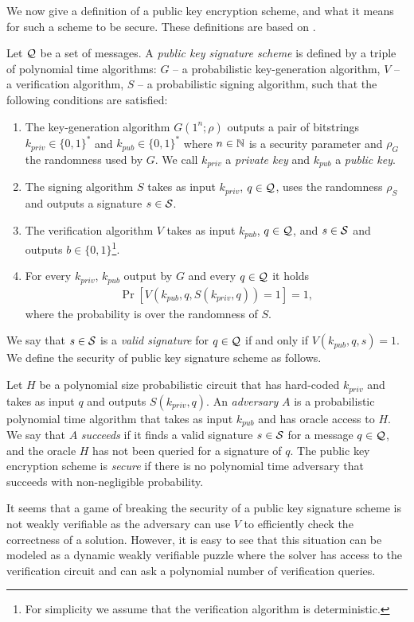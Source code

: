 We now give a definition of a public key encryption scheme, and what it means for such a scheme to be secure.
These definitions are based on \cite{Goldreich:2004:FCV:975541}.

\begin{definition}
Let $\mathcal{Q}$ be a set of messages. A \textit{public key signature scheme} is defined by a triple of polynomial time algorithms:
$G$ -- a probabilistic key-generation algorithm,
$V$ -- a verification algorithm,
$S$ -- a probabilistic signing algorithm,
such that the following conditions are satisfied:
\begin{enumerate}[-]
  \item The key-generation algorithm $G(1^n; \rho)$ outputs a pair of bitstrings $k_{priv} \in \{0,1\}^{*}$ and $k_{pub} \in \{0,1\}^{*}$ where $n \in \mathbb{N}$ is a security
    parameter and $\rho_G$ the randomness used by $G$. We call $k_{priv}$ a \textit{private key} and $k_{pub}$ a \textit{public key}.
  \item The signing algorithm $S$ takes as input $k_{priv}$, $q \in \mathcal{Q}$, uses the randomness $\rho_S$ and outputs a signature $s \in \mathcal{S}$.
  \item The verification algorithm $V$ takes as input $k_{pub}$, $q \in \mathcal{Q}$, and $s \in \mathcal{S}$ and outputs $b \in \{0,1\}$\footnote{For simplicity we assume that the verification
algorithm is deterministic.}.
  \item For every $k_{priv}$, $k_{pub}$ output by $G$ and every $q \in \mathcal{Q}$ it holds
    \begin{align*}
      \Pr[V(k_{pub}, q, S(k_{priv}, q)) = 1] = 1,
    \end{align*}
    where the probability is over the randomness of $S$.
\end{enumerate}
\end{definition}
We say that $s \in \mathcal{S}$ is a \textit{valid signature} for $q \in \mathcal{Q}$ if and only if $V(k_{pub}, q, s) = 1$.
We define the security of public key signature scheme as follows.
%
\begin{definition}
  \label{def:sec_sig}
Let $H$ be a polynomial size probabilistic circuit that has hard-coded $k_{priv}$ and takes as input $q$ and outputs $S(k_{priv}, q)$.
An \textit{adversary} $A$ is a probabilistic polynomial time algorithm that takes as input $k_{pub}$ and has oracle access to $H$.
We say that $A$ \textit{succeeds} if it finds a valid signature $s \in \mathcal{S}$ for a message $q \in \mathcal{Q}$, and the oracle $H$ has not been queried for a signature of $q$.
The public key encryption scheme is \textit{secure} if there is no polynomial time adversary that succeeds with non-negligible probability.
\end{definition}
%
It seems that a game of breaking the security of a public key signature scheme is not weakly verifiable as the adversary can use $V$
to efficiently check the correctness of a solution. However, it is easy to see that this situation can be modeled as
a dynamic weakly verifiable puzzle where the solver has access to the verification circuit and can ask a polynomial number of verification queries.

